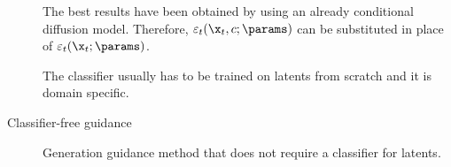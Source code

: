\begin{description}
        \begin{remark}
            The best results have been obtained by using an already conditional diffusion model. Therefore, $\varepsilon_t(\x_t, c; \params)$ can be substituted in place of $\varepsilon_t(\x_t; \params)$.
        \end{remark}

        \begin{remark}
            The classifier usually has to be trained on latents from scratch and it is domain specific.
        \end{remark}

    \item[Classifier-free guidance] 
        Generation guidance method that does not require a classifier for latents.


\end{description}
